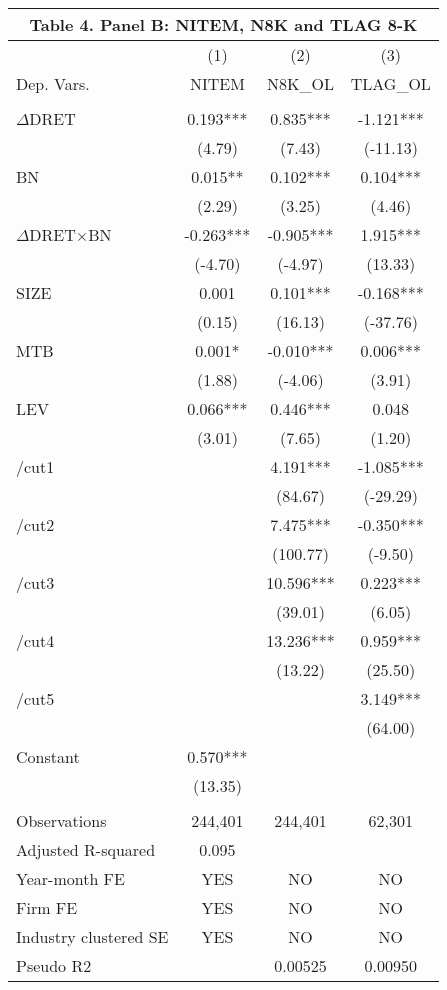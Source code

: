 \begin{table}[htbp] \label{T4PB}
  \centering
    \begin{tabular}{lccc}
    \multicolumn{4}{c}{\textbf{Table 4. Panel B: NITEM, N8K and TLAG 8-K}} \\
    \midrule
      & (1) & (2) & (3) \\
    Dep. Vars. & NITEM & N8K\_OL & TLAG\_OL \\
    \midrule
      &   &   &  \\
    $\Delta$DRET & 0.193*** & 0.835*** & -1.121*** \\
    & (4.79) & (7.43) & (-11.13) \\
    BN & 0.015** & 0.102*** & 0.104*** \\
    & (2.29) & (3.25) & (4.46) \\
    \rowcolor[rgb]{ .933,  .925,  .882} $\Delta$DRET$\times$BN & -0.263*** & -0.905*** & 1.915*** \\
    \rowcolor[rgb]{ .933,  .925,  .882}   & (-4.70) & (-4.97) & (13.33) \\
    SIZE & 0.001 & 0.101*** & -0.168*** \\
    & (0.15) & (16.13) & (-37.76) \\
    MTB & 0.001* & -0.010*** & 0.006*** \\
    & (1.88) & (-4.06) & (3.91) \\
    LEV & 0.066*** & 0.446*** & 0.048 \\
    & (3.01) & (7.65) & (1.20) \\
    /cut1 &   & 4.191*** & -1.085*** \\
    &   & (84.67) & (-29.29) \\
    /cut2 &   & 7.475*** & -0.350*** \\
    &   & (100.77) & (-9.50) \\
    /cut3 &   & 10.596*** & 0.223*** \\
    &   & (39.01) & (6.05) \\
    /cut4 &   & 13.236*** & 0.959*** \\
    &   & (13.22) & (25.50) \\
    /cut5 &   &   & 3.149*** \\
    &   &   & (64.00) \\
    Constant & 0.570*** &   &  \\
    & (13.35) &   &  \\
    &   &   &  \\
    Observations & 244,401 & 244,401 & 62,301 \\
    Adjusted R-squared & 0.095 &   &  \\
    Year-month FE & YES & NO & NO \\
    Firm FE & YES & NO & NO \\
    Industry clustered SE & YES & NO & NO \\
    Pseudo R2 &   & 0.00525 & 0.00950 \\
    \bottomrule
    
    \end{tabular}%
\end{table}%
